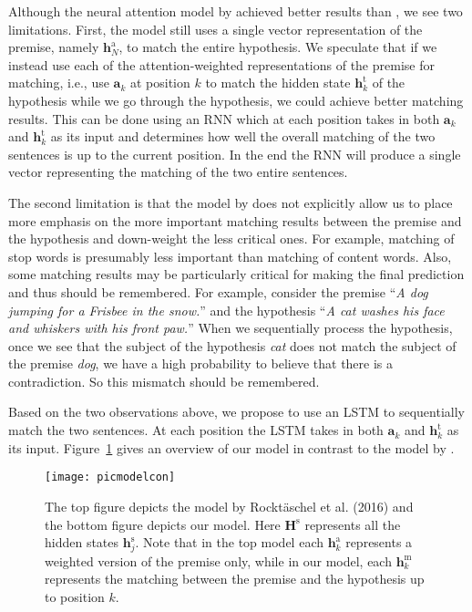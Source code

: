 \documentclass[11pt,letterpaper]{article}
\begin{document}
Although the neural attention model by  achieved better results than , we see two limitations.
First, the model still uses a single vector representation of the premise, namely $\mathbf{h}^\text{a}_N$, to match the entire hypothesis.
We speculate that if we instead use each of the attention-weighted representations of the premise for matching, i.e., use $\mathbf{a}_k$ at position $k$ to match the hidden state $\mathbf{h}^\text{t}_k$ of the hypothesis while we go through the hypothesis, we could achieve better matching results.
This can be done using an RNN which at each position takes in both $\mathbf{a}_k$ and $\mathbf{h}^\text{t}_k$ as its input and determines how well the overall matching of the two sentences is up to the current position.
In the end the RNN will produce a single vector representing the matching of the two entire sentences.

The second limitation is that the model by  does not explicitly allow us to place more emphasis on the more important matching results between the premise and the hypothesis and down-weight the less critical ones.
For example, matching of stop words is presumably less important than matching of content words.
Also, some matching results may be particularly critical for making the final prediction and thus should be remembered.
For example, consider the premise ``\emph{A dog jumping for a Frisbee in the snow.}'' and the hypothesis ``\emph{A cat washes his face and whiskers with his front paw.}''
When we sequentially process the hypothesis, once we see that the subject of the hypothesis \emph{cat} does not match the subject of the premise \emph{dog}, we have a high probability to believe that there is a contradiction.
So this mismatch should be remembered.

Based on the two observations above, we propose to use an LSTM to sequentially match the two sentences.
At each position the LSTM takes in both $\mathbf{a}_k$ and $\mathbf{h}^\text{t}_k$ as its input.
Figure~\ref{fig:model} gives an overview of our model in contrast to the model by .

\begin{figure}[t]
\begin{center}
\texttt{[image: picmodelcon]}
\end{center}
\caption{The top figure depicts the model by Rockt{\"a}schel et al. (2016)
and the bottom figure depicts our model.
Here $\mathbf{H}^\text{s}$ represents all the hidden states $\mathbf{h}^\text{s}_j$.
Note that in the top model 
each $\mathbf{h}^\text{a}_k$ represents a weighted version of the premise only, while in our model, each $\mathbf{h}^\text{m}_k$ represents the matching between the premise and the hypothesis up to position $k$.}
\label{fig:model}
\end{figure}
\end{document}
